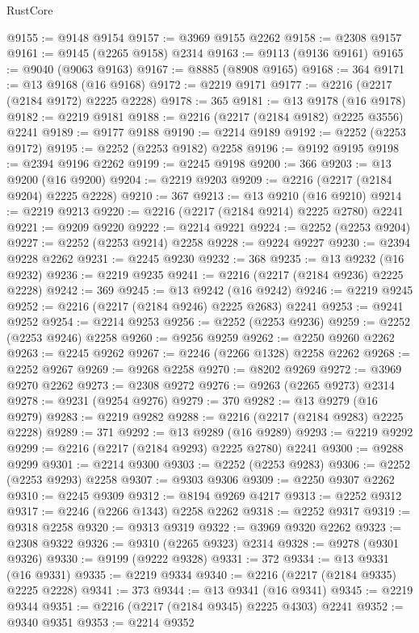 \begin{lexlean}{RustCore}
\begin{coremodule}
@9155 := @9148 @9154
@9157 := @3969 @9155 @2262
@9158 := @2308 @9157
@9161 := @9145 (@2265 @9158) @2314
@9163 := @9113 (@9136 @9161)
@9165 := @9040 (@9063 @9163)
@9167 := @8885 (@8908 @9165)
@9168 := 364
@9171 := @13 @9168 (@16 @9168)
@9172 := @2219 @9171
@9177 := @2216 (@2217 (@2184 @9172) @2225 @2228)
@9178 := 365
@9181 := @13 @9178 (@16 @9178)
@9182 := @2219 @9181
@9188 := @2216 (@2217 (@2184 @9182) @2225 @3556) @2241
@9189 := @9177 @9188
@9190 := @2214 @9189
@9192 := @2252 (@2253 @9172)
@9195 := @2252 (@2253 @9182) @2258
@9196 := @9192 @9195
@9198 := @2394 @9196 @2262
@9199 := @2245 @9198
@9200 := 366
@9203 := @13 @9200 (@16 @9200)
@9204 := @2219 @9203
@9209 := @2216 (@2217 (@2184 @9204) @2225 @2228)
@9210 := 367
@9213 := @13 @9210 (@16 @9210)
@9214 := @2219 @9213
@9220 := @2216 (@2217 (@2184 @9214) @2225 @2780) @2241
@9221 := @9209 @9220
@9222 := @2214 @9221
@9224 := @2252 (@2253 @9204)
@9227 := @2252 (@2253 @9214) @2258
@9228 := @9224 @9227
@9230 := @2394 @9228 @2262
@9231 := @2245 @9230
@9232 := 368
@9235 := @13 @9232 (@16 @9232)
@9236 := @2219 @9235
@9241 := @2216 (@2217 (@2184 @9236) @2225 @2228)
@9242 := 369
@9245 := @13 @9242 (@16 @9242)
@9246 := @2219 @9245
@9252 := @2216 (@2217 (@2184 @9246) @2225 @2683) @2241
@9253 := @9241 @9252
@9254 := @2214 @9253
@9256 := @2252 (@2253 @9236)
@9259 := @2252 (@2253 @9246) @2258
@9260 := @9256 @9259
@9262 := @2250 @9260 @2262
@9263 := @2245 @9262
@9267 := @2246 (@2266 @1328) @2258 @2262
@9268 := @2252 @9267
@9269 := @9268 @2258
@9270 := @8202 @9269
@9272 := @3969 @9270 @2262
@9273 := @2308 @9272
@9276 := @9263 (@2265 @9273) @2314
@9278 := @9231 (@9254 @9276)
@9279 := 370
@9282 := @13 @9279 (@16 @9279)
@9283 := @2219 @9282
@9288 := @2216 (@2217 (@2184 @9283) @2225 @2228)
@9289 := 371
@9292 := @13 @9289 (@16 @9289)
@9293 := @2219 @9292
@9299 := @2216 (@2217 (@2184 @9293) @2225 @2780) @2241
@9300 := @9288 @9299
@9301 := @2214 @9300
@9303 := @2252 (@2253 @9283)
@9306 := @2252 (@2253 @9293) @2258
@9307 := @9303 @9306
@9309 := @2250 @9307 @2262
@9310 := @2245 @9309
@9312 := @8194 @9269 @4217
@9313 := @2252 @9312
@9317 := @2246 (@2266 @1343) @2258 @2262
@9318 := @2252 @9317
@9319 := @9318 @2258
@9320 := @9313 @9319
@9322 := @3969 @9320 @2262
@9323 := @2308 @9322
@9326 := @9310 (@2265 @9323) @2314
@9328 := @9278 (@9301 @9326)
@9330 := @9199 (@9222 @9328)
@9331 := 372
@9334 := @13 @9331 (@16 @9331)
@9335 := @2219 @9334
@9340 := @2216 (@2217 (@2184 @9335) @2225 @2228)
@9341 := 373
@9344 := @13 @9341 (@16 @9341)
@9345 := @2219 @9344
@9351 := @2216 (@2217 (@2184 @9345) @2225 @4303) @2241
@9352 := @9340 @9351
@9353 := @2214 @9352

\end{coremodule}
\end{lexlean}

